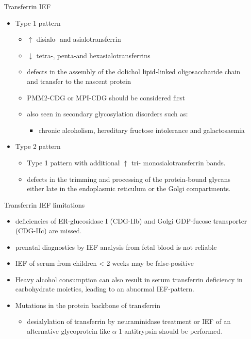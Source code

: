 \documentclass[presentation, smaller]{beamer}
\begin{document}
\begin{frame}[label={sec:orgc023a8a}]{Transferrin IEF}
\begin{itemize}
\item Type 1 pattern

\begin{itemize}
\item \(\uparrow\) disialo- and asialotransferrin

\item \(\downarrow\)  tetra-, penta-and hexasialotransferrins

\item defects in the assembly of the dolichol lipid-linked
oligosaccharide chain and transfer to the nascent protein
\item PMM2-CDG or MPI-CDG should be considered first

\item also seen in secondary glycosylation disorders such as:
\begin{itemize}
\item chronic alcoholism, hereditary fructose intolerance and galactosaemia
\end{itemize}
\end{itemize}

\item Type 2 pattern

\begin{itemize}
\item Type 1 pattern with additional \(\uparrow\) tri- \textpm{}
monosialotransferrin bands.

\item defects in the trimming and processing of the protein-bound
glycans either late in the endoplasmic reticulum or the Golgi
compartments.
\end{itemize}
\end{itemize}
\end{frame}

\begin{frame}[label={sec:orgd1bc932}]{Transferrin IEF limitations}
\begin{itemize}
\item deficiencies of ER-glucosidase I (CDG-IIb) and Golgi GDP-fucose
transporter (CDG-IIc) are missed.
\item prenatal diagnostics by IEF analysis from fetal blood is not
reliable
\item IEF of serum from children \textless{} 2 weeks may be false-positive
\item Heavy alcohol consumption can also result in serum transferrin
deficiency in carbohydrate moieties, leading to an abnormal
IEF-pattern.
\item Mutations in the protein backbone of transferrin
\begin{itemize}
\item desialylation of transferrin by neuraminidase treatment or IEF of
an alternative glycoprotein like \(\alpha\) 1-antitrypsin should be
performed.
\end{itemize}
\end{itemize}
\end{frame}
\end{document}
